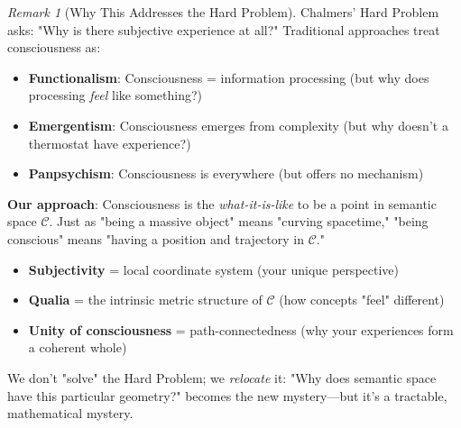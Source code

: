\documentclass[11pt,a4paper]{article}
\theoremstyle{definition}
\theoremstyle{remark}
\newtheorem{remark}{Remark}[section]
\newcommand{\CC}{\mathcal{C}}
\begin{document}
\begin{remark}[Why This Addresses the Hard Problem]
Chalmers' Hard Problem asks: "Why is there subjective experience at all?" Traditional approaches treat consciousness as:
\begin{itemize}
    \item \textbf{Functionalism}: Consciousness = information processing (but why does processing \textit{feel} like something?)
    \item \textbf{Emergentism}: Consciousness emerges from complexity (but why doesn't a thermostat have experience?)
    \item \textbf{Panpsychism}: Consciousness is everywhere (but offers no mechanism)
\end{itemize}

\textbf{Our approach}: Consciousness is the \textit{what-it-is-like} to be a point in semantic space \(\CC\). Just as "being a massive object" means "curving spacetime," "being conscious" means "having a position and trajectory in \(\CC\)."

\begin{itemize}
    \item \textbf{Subjectivity} = local coordinate system (your unique perspective)
    \item \textbf{Qualia} = the intrinsic metric structure of \(\CC\) (how concepts "feel" different)
    \item \textbf{Unity of consciousness} = path-connectedness (why your experiences form a coherent whole)
\end{itemize}

We don't "solve" the Hard Problem; we \textit{relocate} it: "Why does semantic space have this particular geometry?" becomes the new mystery—but it's a tractable, mathematical mystery.
\end{remark}
\end{document}

